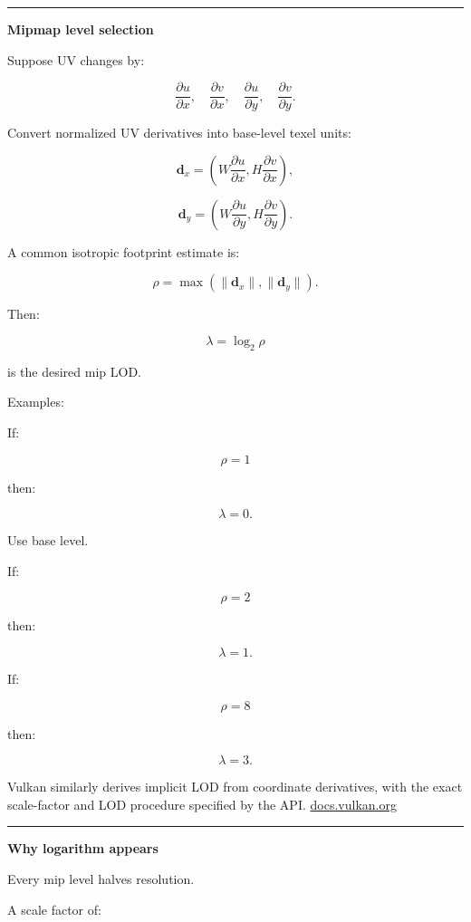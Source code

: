 \begin{center}\rule{0.5\linewidth}{0.5pt}\end{center}

\textbf{Mipmap level selection}

Suppose UV changes by:

\[
\frac{\partial u}{\partial x},
\quad
\frac{\partial v}{\partial x},
\quad
\frac{\partial u}{\partial y},
\quad
\frac{\partial v}{\partial y}.
\]

Convert normalized UV derivatives into base-level texel units:

\[
\mathbf d_x=
\left(
W\frac{\partial u}{\partial x},
H\frac{\partial v}{\partial x}
\right),
\]

\[
\mathbf d_y=
\left(
W\frac{\partial u}{\partial y},
H\frac{\partial v}{\partial y}
\right).
\]

A common isotropic footprint estimate is:

\[
\rho=
\max(
\|\mathbf d_x\|,
\|\mathbf d_y\|
).
\]

Then:

\[
\boxed{
\lambda=\log_2\rho
}
\]

is the desired mip LOD.

Examples:

If:

\[
\rho=1
\]

then:

\[
\lambda=0.
\]

Use base level.

If:

\[
\rho=2
\]

then:

\[
\lambda=1.
\]

If:

\[
\rho=8
\]

then:

\[
\lambda=3.
\]

Vulkan similarly derives implicit LOD from coordinate derivatives, with the exact scale-factor and LOD procedure specified by the API. \href{https://docs.vulkan.org/spec/latest/chapters/textures.html?utm_source=chatgpt.com}{docs.vulkan.org}

\begin{center}\rule{0.5\linewidth}{0.5pt}\end{center}

\textbf{Why logarithm appears}

Every mip level halves resolution.

A scale factor of:

